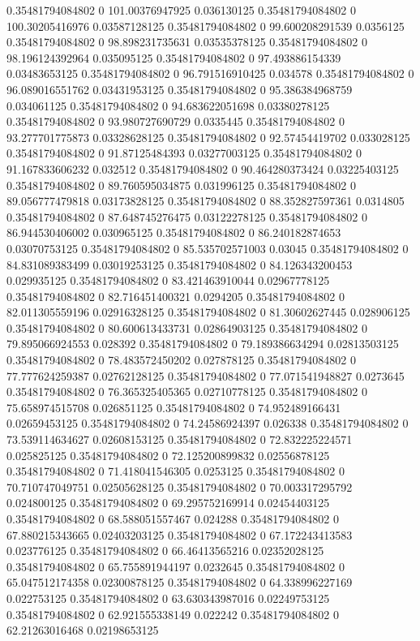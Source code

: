 0.35481794084802 0 101.00376947925 0.036130125
0.35481794084802 0 100.30205416976 0.03587128125
0.35481794084802 0 99.600208291539 0.0356125
0.35481794084802 0 98.898231735631 0.03535378125
0.35481794084802 0 98.196124392964 0.035095125
0.35481794084802 0 97.493886154339 0.03483653125
0.35481794084802 0 96.791516910425 0.034578
0.35481794084802 0 96.089016551762 0.03431953125
0.35481794084802 0 95.386384968759 0.034061125
0.35481794084802 0 94.683622051698 0.03380278125
0.35481794084802 0 93.980727690729 0.0335445
0.35481794084802 0 93.277701775873 0.03328628125
0.35481794084802 0 92.57454419702 0.033028125
0.35481794084802 0 91.87125484393 0.03277003125
0.35481794084802 0 91.167833606232 0.032512
0.35481794084802 0 90.464280373424 0.03225403125
0.35481794084802 0 89.760595034875 0.031996125
0.35481794084802 0 89.056777479818 0.03173828125
0.35481794084802 0 88.352827597361 0.0314805
0.35481794084802 0 87.648745276475 0.03122278125
0.35481794084802 0 86.944530406002 0.030965125
0.35481794084802 0 86.240182874653 0.03070753125
0.35481794084802 0 85.535702571003 0.03045
0.35481794084802 0 84.831089383499 0.03019253125
0.35481794084802 0 84.126343200453 0.029935125
0.35481794084802 0 83.421463910044 0.02967778125
0.35481794084802 0 82.716451400321 0.0294205
0.35481794084802 0 82.011305559196 0.02916328125
0.35481794084802 0 81.30602627445 0.028906125
0.35481794084802 0 80.600613433731 0.02864903125
0.35481794084802 0 79.895066924553 0.028392
0.35481794084802 0 79.189386634294 0.02813503125
0.35481794084802 0 78.483572450202 0.027878125
0.35481794084802 0 77.777624259387 0.02762128125
0.35481794084802 0 77.071541948827 0.0273645
0.35481794084802 0 76.365325405365 0.02710778125
0.35481794084802 0 75.658974515708 0.026851125
0.35481794084802 0 74.952489166431 0.02659453125
0.35481794084802 0 74.24586924397 0.026338
0.35481794084802 0 73.539114634627 0.02608153125
0.35481794084802 0 72.832225224571 0.025825125
0.35481794084802 0 72.125200899832 0.02556878125
0.35481794084802 0 71.418041546305 0.0253125
0.35481794084802 0 70.710747049751 0.02505628125
0.35481794084802 0 70.003317295792 0.024800125
0.35481794084802 0 69.295752169914 0.02454403125
0.35481794084802 0 68.588051557467 0.024288
0.35481794084802 0 67.880215343665 0.02403203125
0.35481794084802 0 67.172243413583 0.023776125
0.35481794084802 0 66.46413565216 0.02352028125
0.35481794084802 0 65.755891944197 0.0232645
0.35481794084802 0 65.047512174358 0.02300878125
0.35481794084802 0 64.338996227169 0.022753125
0.35481794084802 0 63.630343987016 0.02249753125
0.35481794084802 0 62.921555338149 0.022242
0.35481794084802 0 62.21263016468 0.02198653125
